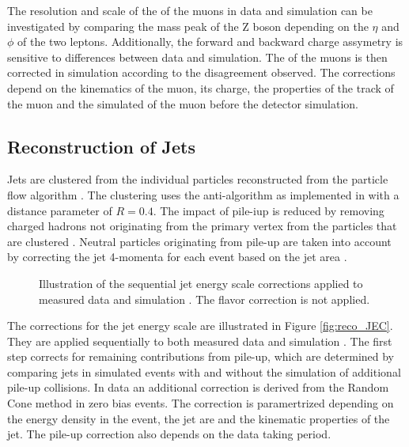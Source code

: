 The resolution and scale of the \pt of the muons in data and simulation can be investigated by comparing the mass peak of the Z boson depending on the $\eta$ and $\phi$ of the two leptons.
Additionally, the forward and backward charge assymetry is sensitive to differences between data and simulation.
The \pt of the muons is then corrected in simulation according to the disagreement observed. The corrections depend on the kinematics of the muon, its charge, the properties of the track of the muon and the simulated \pt
of the muon before the detector simulation.

\subsection{Reconstruction of Jets}
\label{sec:SimReco_BjetReco}

Jets are clustered from the individual particles reconstructed from the particle flow algorithm \cite{CMS-PAS-JME-16-003}.
The clustering uses the anti-\kt algorithm \cite{Cacciari:2008gp} as implemented in \FASTJET \cite{Cacciari:2011ma} with a distance parameter of $R = 0.4$.
The impact of pile-iup is reduced by removing charged hadrons not originating from the primary vertex from the particles that are clustered \cite{CMS-PAS-JME-14-001}.
Neutral particles originating from pile-up are taken into account by correcting the jet 4-momenta for each event based on the jet area \cite{1126-6708-2008-04-005,CACCIARI2008119}.

\begin{figure}[htbp!]
  \begin{center}
\caption{Illustration of the sequential jet energy scale corrections applied to measured data and simulation \cite{Khachatryan:2016kdb}. The flavor correction is not applied.
  \label{fig:reco_jec}}
  \end{center}
\end{figure}


The corrections for the jet energy scale are illustrated in Figure \ref{fig:reco_JEC}. They are applied sequentially to both measured data and simulation \cite{Khachatryan:2016kdb,CMS-PAS-JME-16-003}.
The first step corrects for remaining contributions from pile-up, which are determined by comparing jets in simulated events with and without the simulation of additional pile-up collisions.
In data an additional correction is derived from the Random Cone method in zero bias events. The correction is paramertrized depending on the energy density in the event, the jet are and the kinematic
properties of the jet. The pile-up correction also depends on the data taking period.

